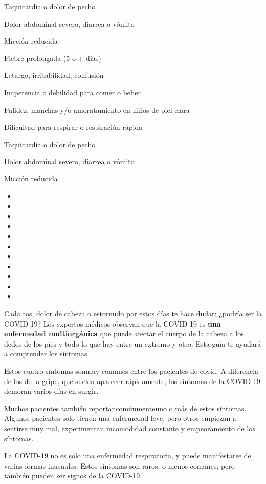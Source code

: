Taquicardia o dolor de pecho

Dolor abdominal severo, diarrea o vómito

Micción reducida

Fiebre prolongada (5 o + días)

Letargo, irritabilidad, confusión

Inapetencia o debilidad para comer o beber

Palidez, manchas y/o amoratamiento en niños de piel clara

Dificultad para respirar o respiración rápida

Taquicardia o dolor de pecho

Dolor abdominal severo, diarrea o vómito

Micción reducida

\begin{itemize}
\item
\item
\item
\item
\item
\item
\item
\item
\item
\item
\item
\end{itemize}

Cada tos, dolor de cabeza o estornudo por estos días te hace dudar:
¿podría ser la COVID-19? Los expertos médicos observan que la COVID-19
es \textbf{una enfermedad multiorgánica} que puede afectar el cuerpo de
la cabeza a los dedos de los pies y todo lo que hay entre un extremo y
otro. Esta guía te ayudará a comprender los síntomas.

Estos cuatro síntomas sonmuy comunes entre los pacientes de covid. A
diferencia de los de la gripe, que suelen aparecer rápidamente, los
síntomas de la COVID-19 demoran varios días en surgir.

Muchos pacientes también reportancomúnmenteuno o más de estos síntomas.
Algunos pacientes solo tienen una enfermedad leve, pero otros empiezan a
sentirse muy mal, experimentan incomodidad constante y empeoramiento de
los síntomas.

La COVID-19 no es solo una enfermedad respiratoria, y puede manifestarse
de varias formas inusuales. Estos síntomas son raros, o menos comunes,
pero también pueden ser signos de la COVID-19.

